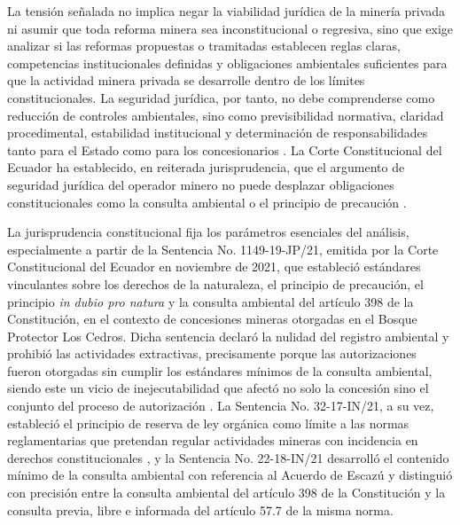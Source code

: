 La tensión señalada no implica negar la viabilidad jurídica de la minería privada ni asumir que toda reforma minera sea inconstitucional o regresiva, sino que exige analizar si las reformas propuestas o tramitadas establecen reglas claras, competencias institucionales definidas y obligaciones ambientales suficientes para que la actividad minera privada se desarrolle dentro de los límites constitucionales. La seguridad jurídica, por tanto, no debe comprenderse como reducción de controles ambientales, sino como previsibilidad normativa, claridad procedimental, estabilidad institucional y determinación de responsabilidades tanto para el Estado como para los concesionarios \parencite{villacis_calvas_2022}. La Corte Constitucional del Ecuador ha establecido, en reiterada jurisprudencia, que el argumento de seguridad jurídica del operador minero no puede desplazar obligaciones constitucionales como la consulta ambiental o el principio de precaución \parencite{cce_1149_19_jp_21}.

La jurisprudencia constitucional fija los parámetros esenciales del análisis, especialmente a partir de la Sentencia No. 1149-19-JP/21, emitida por la Corte Constitucional del Ecuador en noviembre de 2021, que estableció estándares vinculantes sobre los derechos de la naturaleza, el principio de precaución, el principio \textit{in dubio pro natura} y la consulta ambiental del artículo 398 de la Constitución, en el contexto de concesiones mineras otorgadas en el Bosque Protector Los Cedros. Dicha sentencia declaró la nulidad del registro ambiental y prohibió las actividades extractivas, precisamente porque las autorizaciones fueron otorgadas sin cumplir los estándares mínimos de la consulta ambiental, siendo este un vicio de inejecutabilidad que afectó no solo la concesión sino el conjunto del proceso de autorización \parencite{cce_1149_19_jp_21}. La Sentencia No. 32-17-IN/21, a su vez, estableció el principio de reserva de ley orgánica como límite a las normas reglamentarias que pretendan regular actividades mineras con incidencia en derechos constitucionales \parencite{cce_32_17_in_21}, y la Sentencia No. 22-18-IN/21 desarrolló el contenido mínimo de la consulta ambiental con referencia al Acuerdo de Escazú y distinguió con precisión entre la consulta ambiental del artículo 398 de la Constitución y la consulta previa, libre e informada del artículo 57.7 de la misma norma.

